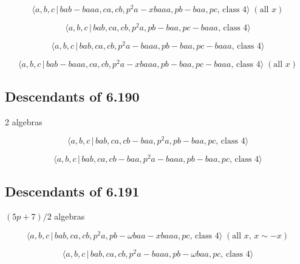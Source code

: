 \documentclass[10pt]{article}
\begin{document}
\begin{equation}
\langle a,b,c\,|\,bab-baaa,ca,cb,p^2a-xbaaa,pb-baa,pc,\,\text{class }%
4\rangle \;(\text{all }x)  \tag{7.1858}
\end{equation}

\begin{equation}
\langle a,b,c\,|\,bab,ca,cb,p^2a,pb-baa,pc-baaa,\,\text{class }4\rangle 
\tag{7.1859}
\end{equation}

\begin{equation}
\langle a,b,c\,|\,bab,ca,cb,p^2a-baaa,pb-baa,pc-baaa,\,\text{class }4\rangle
\tag{7.1860}
\end{equation}

\begin{equation}
\langle a,b,c\,|\,bab-baaa,ca,cb,p^2a-xbaaa,pb-baa,pc-baaa,\,\text{class }%
4\rangle \;(\text{all }x)  \tag{7.1861}
\end{equation}

\subsection{Descendants of 6.190}

2 algebras

\begin{equation}
\langle a,b,c\,|\,bab,ca,cb-baa,p^2a,pb-baa,pc,\,\text{class }4\rangle 
\tag{7.1862}
\end{equation}

\begin{equation}
\langle a,b,c\,|\,bab,ca,cb-baa,p^2a-baaa,pb-baa,pc,\,\text{class }4\rangle 
\tag{7.1863}
\end{equation}

\subsection{Descendants of 6.191}

$(5p+7)/2$ algebras

\begin{equation}
\langle a,b,c\,|\,bab,ca,cb,p^{2}a,pb-\omega baa-xbaaa,pc,\,\text{class }%
4\rangle \;(\text{all }x,\,x\sim -x)  \tag{7.1864}
\end{equation}

\begin{equation}
\langle a,b,c\,|\,bab,ca,cb,p^{2}a-baaa,pb-\omega baa,pc,\,\text{class }%
4\rangle  \tag{7.1865}
\end{equation}
\end{document}
